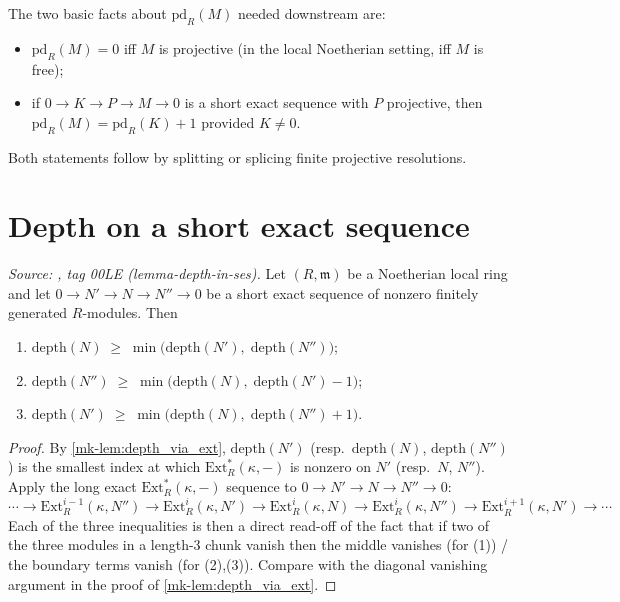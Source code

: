 The two basic facts about \(\text{pd}_R(M)\) needed downstream are:
\begin{itemize}
  \item \(\text{pd}_R(M) = 0\) iff \(M\) is projective (in the local Noetherian setting,
    iff \(M\) is free);
  \item if \(0 \to K \to P \to M \to 0\) is a short exact sequence with \(P\) projective, then
    \(\text{pd}_R(M) = \text{pd}_R(K) + 1\) provided \(K \neq 0\).
\end{itemize}
Both statements follow by splitting or splicing finite projective resolutions.

\section{Depth on a short exact sequence}
\label{mk-sec:ab_depth_ses}

\begin{lemma}\label{mk-lem:depth_short_exact_sequence}
  \leanok


  \textit{Source: \cite{stacks-project}, tag 00LE (lemma-depth-in-ses).}
  Let \((R, \mathfrak{m})\) be a Noetherian local ring and let
  \(0 \to N' \to N \to N'' \to 0\) be a short exact sequence of nonzero finitely generated
  \(R\)-modules. Then
  \begin{enumerate}
    \item \(\text{depth}(N) \;\geq\; \min\bigl(\text{depth}(N'),\; \text{depth}(N'')\bigr)\);
    \item \(\text{depth}(N'') \;\geq\; \min\bigl(\text{depth}(N),\; \text{depth}(N') - 1\bigr)\);
    \item \(\text{depth}(N') \;\geq\; \min\bigl(\text{depth}(N),\; \text{depth}(N'') + 1\bigr)\).
  \end{enumerate}
\end{lemma}

\begin{proof}
  \leanok


  By \ref{mk-lem:depth_via_ext}, \(\text{depth}(N')\) (resp.\ \(\text{depth}(N)\),
  \(\text{depth}(N'')\)) is the smallest index at which \(\text{Ext}^*_R(\kappa, -)\) is
  nonzero on \(N'\) (resp.\ \(N\), \(N''\)). Apply the long exact \(\text{Ext}^*_R(\kappa, -)\)
  sequence to \(0 \to N' \to N \to N'' \to 0\):
  \[
    \cdots \to \text{Ext}^{i-1}_R(\kappa, N'')
    \to \text{Ext}^i_R(\kappa, N')
    \to \text{Ext}^i_R(\kappa, N)
    \to \text{Ext}^i_R(\kappa, N'')
    \to \text{Ext}^{i+1}_R(\kappa, N') \to \cdots
  \]
  Each of the three inequalities is then a direct read-off of the fact that if two
  of the three modules in a length-3 chunk vanish then the middle vanishes (for (1)) /
  the boundary terms vanish (for (2),(3)). Compare with the diagonal vanishing argument in
  the proof of \ref{mk-lem:depth_via_ext}.
\end{proof}

